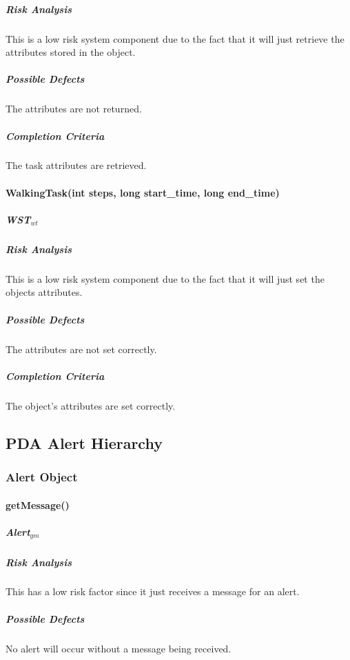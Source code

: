 \documentclass{article}
\begin{document}
\subparagraph{Risk Analysis}
This is a low risk system component due to the fact that it will just retrieve the attributes stored in the object.

\subparagraph{Possible Defects}
The attributes are not returned.

\subparagraph{Completion Criteria}
The task attributes are retrieved.

\paragraph{WalkingTask(int steps, long start\_time, long end\_time)}

\subparagraph{WST$_{wt}$}

\subparagraph{Risk Analysis}
This is a low risk system component due to the fact that it will just set the objects attributes.

\subparagraph{Possible Defects}
The attributes are not set correctly.

\subparagraph{Completion Criteria}
The object's attributes are set correctly.

\subsection{PDA Alert Hierarchy}

\subsubsection{Alert Object}

\paragraph{getMessage()}

\subparagraph{Alert$_{gm}$}

\subparagraph{Risk Analysis}
This has a low risk factor since it just receives a message for an alert.

\subparagraph{Possible Defects}
No alert will occur without a message being received.
\end{document}

